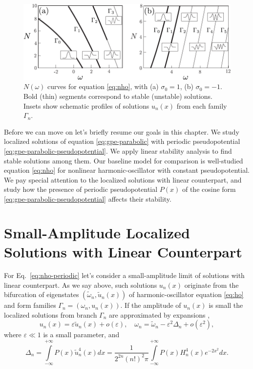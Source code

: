 \begin{figure}[h]
\centering
	\includegraphics[scale = 1]{pic/stability for nho with constant pseudopotential}
	\caption{
		$N(\omega)$ curves for equation \eqref{eq:nho}, with (a) $\sigma_0 = 1$, (b) $\sigma_0 = -1$.
		Bold (thin) segments correspond to stable (unstable) solutions.
		Insets show schematic profiles of solutions $u_n(x)$ from each family $\Gamma_n$.
	}
\label{fig:branches-nho}
\end{figure}

Before we can move on let's briefly resume our goals in this chapter.
We study localized solutions of equation \eqref{eq:gpe-parabolic} with periodic pseudopotential \eqref{eq:gpe-parabolic-pseudopotential}.
We apply linear stability analysis to find stable solutions among them.
Our baseline model for comparison is well-studied equation \eqref{eq:nho} for nonlinear harmonic-oscillator with constant pseudopotential.
We pay special attention to the localized solutions with linear counterpart, and study how the presence of periodic pseudopotential $P(x)$ of the cosine form \eqref{eq:gpe-parabolic-pseudopotential} affects their stability.

\section{Small-Amplitude Localized Solutions with Linear Counterpart}

For Eq.~\eqref{eq:nho-periodic} let's consider a small-amplitude limit of solutions with linear counterpart.
As we say above, such solutions $u_n(x)$ originate from the bifurcation of eigenstates $(\tilde{\omega}_n, \tilde{u}_n(x))$ of harmonic-oscillator equation \eqref{eq:ho} and form families $\Gamma_n = (\omega_n, u_n(x))$.
If the amplitude of $u_n(x)$ is small the localized solutions from branch $\Gamma_n$ are approximated by expansions \cite{ZezyulinAlfimovKonotopPerecGarcia2008},
\begin{equation}
	u_n(x) = \varepsilon \tilde{u}_n(x) + o(\varepsilon), \quad \omega_n = \tilde{\omega}_n - \varepsilon^2 \Delta_n + o(\varepsilon^2),
\label{eq:small-amplitude-expansion}
\end{equation}
where $\varepsilon \ll 1$ is a small parameter, and
\begin{equation}
	\Delta_n = \int \limits_{-\infty}^{+\infty} P(x) \tilde{u}_n^4(x) dx = \dfrac{1}{2^{2n} (n!)^2 \pi} \int \limits_{-\infty}^{+\infty} P(x) H_n^4(x) e^{-2x^2} dx.
\end{equation}

